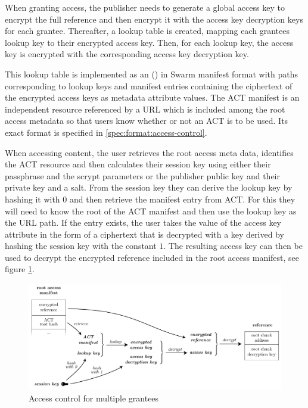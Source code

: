 When granting access, the publisher needs to generate a global access key to encrypt the full reference and then encrypt it with the
access key decryption keys for each grantee. Thereafter, a lookup table is created, mapping each grantees lookup key to their encrypted access key. Then, for each lookup key, the access key is encrypted with the corresponding access key decryption key.

This lookup table is implemented as an  () in Swarm manifest format with paths corresponding to lookup keys and manifest entries containing the ciphertext of the encrypted access keys as metadata attribute values. The ACT manifest is an independent resource referenced by a URL which is included among the root access metadata so that users know whether or not an ACT is to be used. Its exact format is specified in \ref{spec:format:access-control}.

When accessing content, the user retrieves the root access meta data, identifies the ACT resource and then calculates their session key using either their passphrase and the scrypt parameters or the publisher public key and their private key and a salt. From the session key they can derive the lookup key by hashing it with $0$ and then retrieve the manifest entry from ACT. For this they will need to know the root of the ACT manifest and then use the lookup key as the URL path. If the entry exists, the user takes the value of the access key attribute in the form of a ciphertext that is decrypted with a key derived by hashing the session key with the constant $1$. The resulting access key can then be used to decrypt the encrypted reference included in the root access manifest, see figure \ref{fig:access-control-multiple-party}.


\begin{figure}[htbp]
\centering
\includegraphics[width=\textwidth]{fig/access-control-multiple-party.pdf}
\caption[Access control for multiple grantees \statusyellow]{Access control for multiple grantees}
\label{fig:access-control-multiple-party}
\end{figure}


